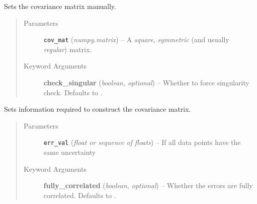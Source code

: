 \documentclass[a4paper,10pt,english]{sphinxmanual}
\begin{document}
\begin{fulllineitems}
\begin{fulllineitems}
\begin{quote}
\begin{description}
\end{description}\end{quote}

\end{fulllineitems}


\begin{fulllineitems}
\label{module_doc:kafe.dataset.ErrorSource.make_from_matrix}
Sets the covariance matrix manually.
\begin{quote}\begin{description}
\item[{Parameters}] \leavevmode
\textbf{\texttt{cov\_mat}} (\emph{numpy.matrix}) -- A \emph{square}, \emph{symmetric} (and usually \emph{regular}) matrix.

\item[{Keyword Arguments}] \leavevmode
\textbf{check\_singular} (\emph{boolean, optional}) --
Whether to force singularity check. Defaults to .

\end{description}\end{quote}

\end{fulllineitems}


\begin{fulllineitems}
\label{module_doc:kafe.dataset.ErrorSource.make_from_val}
Sets information required to construct the covariance matrix.
\begin{quote}\begin{description}
\item[{Parameters}] \leavevmode
\textbf{\texttt{err\_val}} (\emph{float or sequence of floats}) -- If all data points have the same uncertainty

\item[{Keyword Arguments}] \leavevmode
\textbf{fully\_correlated} (\emph{boolean, optional}) --
Whether the errors are fully correlated. Defaults to .

\end{description}\end{quote}

\end{fulllineitems}


\end{fulllineitems}
\end{document}
